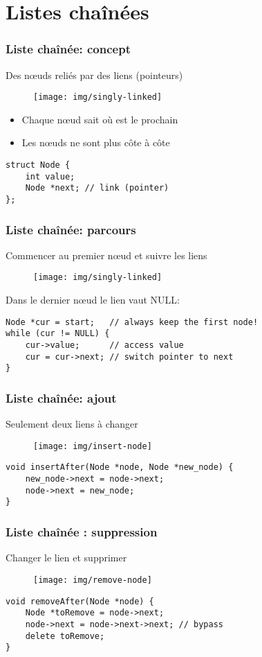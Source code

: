 \documentclass[12pt]{beamer}
\begin{document}
\section{Listes chaînées}

\begin{frame}[fragile]
\frametitle{Liste chaînée: concept}
Des nœuds reliés par des liens (pointeurs)
\begin{figure}
\centering
\texttt{[image: img/singly-linked]}
\end{figure}
\begin{itemize}
\item Chaque nœud sait où est le prochain
\item Les nœuds ne sont plus côte à côte
\end{itemize}
\begin{lstlisting}
struct Node {
    int value;
    Node *next; // link (pointer)
};
\end{lstlisting}
\end{frame}

\begin{frame}[fragile]
\frametitle{Liste chaînée: parcours}
Commencer au premier nœud et suivre les liens
\begin{figure}
\centering
\texttt{[image: img/singly-linked]}
\end{figure}
Dans le dernier nœud le lien vaut NULL:
\begin{lstlisting}
Node *cur = start;   // always keep the first node!
while (cur != NULL) {
    cur->value;      // access value
    cur = cur->next; // switch pointer to next
}
\end{lstlisting}
\end{frame}

\begin{frame}[fragile]
\frametitle{Liste chaînée: ajout}
Seulement deux liens à changer
\begin{figure}
\centering
\texttt{[image: img/insert-node]}
\end{figure}
\begin{lstlisting}
void insertAfter(Node *node, Node *new_node) {
    new_node->next = node->next;
    node->next = new_node;
}
\end{lstlisting}
\end{frame}

\begin{frame}[fragile]
\frametitle{Liste chaînée : suppression}
Changer le lien et supprimer
\begin{figure}
\centering
\texttt{[image: img/remove-node]}
\end{figure}
\begin{lstlisting}
void removeAfter(Node *node) {
    Node *toRemove = node->next;
    node->next = node->next->next; // bypass
    delete toRemove;
}
\end{lstlisting}
\end{frame}
\end{document}
